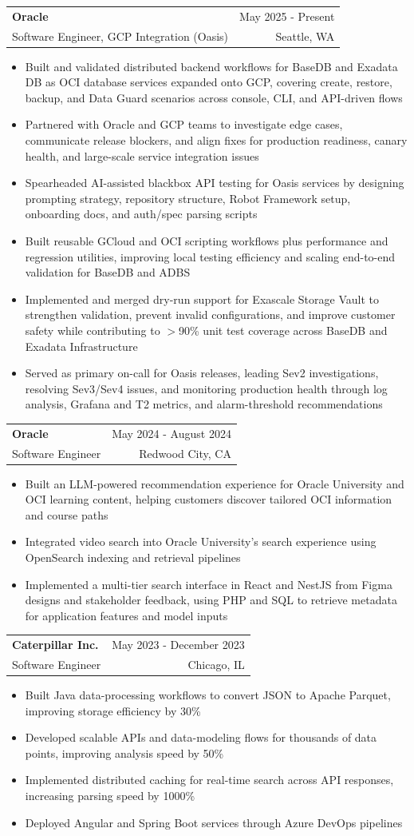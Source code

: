 \documentclass[letterpaper,11pt]{article}
\makeatletter
\newcommand{\resumeItem}[1]{
  \item\small{
    {#1 \vspace{-2pt}}
  }
}
\newcommand{\resumeSubheading}[4]{
  \vspace{-2pt}\item
    \begin{tabular*}{0.97\textwidth}[t]{l@{\extracolsep{\fill}}r}
      \textbf{#1} & #2 \\
      {\small#3} & {\small #4} \\
    \end{tabular*}\vspace{-7pt}
}
\newcommand{\resumeItemListStart}{\begin{itemize}}
\newcommand{\resumeItemListEnd}{\end{itemize}\vspace{-5pt}}
\makeatother
\begin{document}
    \resumeSubheading
  {Oracle}{May 2025 - Present}
  {Software Engineer, GCP Integration (Oasis)}{Seattle, WA}
  \resumeItemListStart
    \resumeItem{Built and validated distributed backend workflows for BaseDB and Exadata DB as OCI database services expanded onto GCP, covering create, restore, backup, and Data Guard scenarios across console, CLI, and API-driven flows}
    \resumeItem{Partnered with Oracle and GCP teams to investigate edge cases, communicate release blockers, and align fixes for production readiness, canary health, and large-scale service integration issues}
    \resumeItem{Spearheaded AI-assisted blackbox API testing for Oasis services by designing prompting strategy, repository structure, Robot Framework setup, onboarding docs, and auth/spec parsing scripts}
    \resumeItem{Built reusable GCloud and OCI scripting workflows plus performance and regression utilities, improving local testing efficiency and scaling end-to-end validation for BaseDB and ADBS}
    \resumeItem{Implemented and merged dry-run support for Exascale Storage Vault to strengthen validation, prevent invalid configurations, and improve customer safety while contributing to $>$90\% unit test coverage across BaseDB and Exadata Infrastructure}
    \resumeItem{Served as primary on-call for Oasis releases, leading Sev2 investigations, resolving Sev3/Sev4 issues, and monitoring production health through log analysis, Grafana and T2 metrics, and alarm-threshold recommendations}
  \resumeItemListEnd

    \resumeSubheading
      {Oracle}{May 2024 - August 2024}
      {Software Engineer}{Redwood City, CA}
      \resumeItemListStart
        \resumeItem{Built an LLM-powered recommendation experience for Oracle University and OCI learning content, helping customers discover tailored OCI information and course paths}
        \resumeItem{Integrated video search into Oracle University's search experience using OpenSearch indexing and retrieval pipelines}
        \resumeItem{Implemented a multi-tier search interface in React and NestJS from Figma designs and stakeholder feedback, using PHP and SQL to retrieve metadata for application features and model inputs}
      \resumeItemListEnd

    \resumeSubheading
      {Caterpillar Inc.}{May 2023 - December 2023}
      {Software Engineer}{Chicago, IL}
      \resumeItemListStart
        \resumeItem{Built Java data-processing workflows to convert JSON to Apache Parquet, improving storage efficiency by 30\%}
        \resumeItem{Developed scalable APIs and data-modeling flows for thousands of data points, improving analysis speed by 50\%}
        \resumeItem{Implemented distributed caching for real-time search across API responses, increasing parsing speed by 1000\%}
        \resumeItem{Deployed Angular and Spring Boot services through Azure DevOps pipelines}
      \resumeItemListEnd
\end{document}
